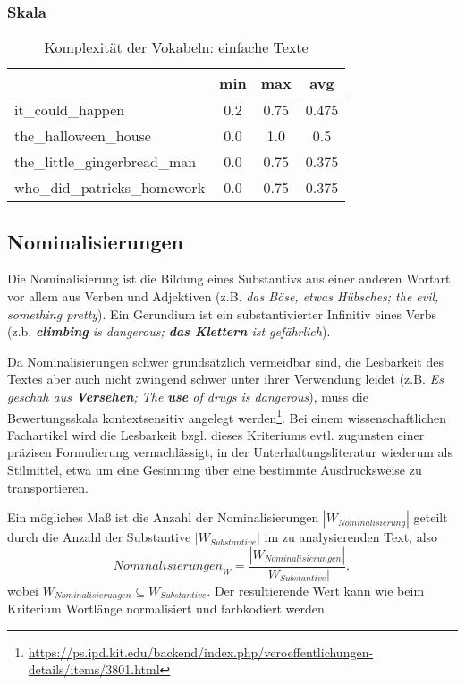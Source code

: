 \documentclass[10pt,a4paper]{article}
\begin{document}
	\subsubsection*{Skala}
		\begin{table}[H]
			\centering
			\begin{tabular}{|l|c|c|c|}
				\hline  & min & max & avg \\ 
				\hline it\_could\_happen & 0.2 & 0.75 & 0.475 \\ 
				\hline the\_halloween\_house & 0.0 & 1.0 & 0.5 \\ 
				\hline the\_little\_gingerbread\_man & 0.0 & 0.75 & 0.375 \\ 
				\hline who\_did\_patricks\_homework & 0.0 & 0.75 & 0.375 \\ 
				\hline 
			\end{tabular} 
			\caption{Komplexität der Vokabeln: einfache Texte}
		\end{table}
		
	\subsection*{Nominalisierungen}
	Die Nominalisierung ist die Bildung eines Substantivs aus einer anderen Wortart, vor allem aus Verben und Adjektiven (z.B. \textit{das Böse, etwas Hübsches; the evil, something pretty}). Ein Gerundium ist ein substantivierter Infinitiv eines Verbs (z.b. \textit{\textbf{climbing} is dangerous; \textbf{das Klettern} ist gefährlich}).
	
	Da Nominalisierungen schwer grundsätzlich vermeidbar sind, die Lesbarkeit des Textes aber auch nicht zwingend schwer unter ihrer Verwendung leidet (z.B. \textit{Es geschah aus \textbf{Versehen}; The \textbf{use} of drugs is dangerous}), muss die Bewertungsskala kontextsensitiv angelegt werden\footnote{\url{https://ps.ipd.kit.edu/backend/index.php/veroeffentlichungen-details/items/3801.html}}. Bei einem wissenschaftlichen Fachartikel wird die Lesbarkeit bzgl. dieses Kriteriums evtl. zugunsten einer präzisen Formulierung vernachlässigt, in der Unterhaltungsliteratur wiederum als Stilmittel, etwa um eine Gesinnung über eine bestimmte Ausdrucksweise zu transportieren. 
	
	Ein mögliches Maß ist die Anzahl der Nominalisierungen $ |W_{Nominalisierung}| $ geteilt durch die Anzahl der Substantive $ |W_{Substantive}| $ im zu analysierenden Text, also \begin{equation*}
		\textit{Nominalisierungen}_W=\frac{|W_{Nominalisierungen}|}{|W_{Substantive}|},
	\end{equation*}wobei $ W_{Nominalisierungen}\subseteq W_{Substantive} $. Der resultierende Wert kann wie beim Kriterium Wortlänge normalisiert und farbkodiert werden.\\
	
\end{document}
